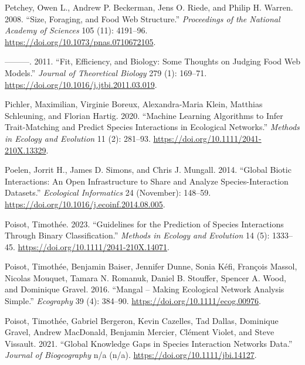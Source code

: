\documentclass[
  letterpaper,
  DIV=11,
  numbers=noendperiod]{scrartcl}
\newlength{\cslhangindent}
\newenvironment{CSLReferences}[2] %
 {\begin{list}{}{%
  \setlength{\itemindent}{0pt}
  \setlength{\leftmargin}{0pt}
  \setlength{\parsep}{0pt}
  \ifodd #1
   \setlength{\leftmargin}{\cslhangindent}
   \setlength{\itemindent}{-1\cslhangindent}
  \fi
  \setlength{\itemsep}{#2\baselineskip}}}
 {\end{list}}
\begin{document}
\begin{CSLReferences}{1}{0}
Petchey, Owen L., Andrew P. Beckerman, Jens O. Riede, and Philip H.
Warren. 2008. {``Size, Foraging, and Food Web Structure.''}
\emph{Proceedings of the National Academy of Sciences} 105 (11):
4191--96. \url{https://doi.org/10.1073/pnas.0710672105}.

---------. 2011. {``Fit, Efficiency, and Biology: {Some} Thoughts on
Judging Food Web Models.''} \emph{Journal of Theoretical Biology} 279
(1): 169--71. \url{https://doi.org/10.1016/j.jtbi.2011.03.019}.

Pichler, Maximilian, Virginie Boreux, Alexandra-Maria Klein, Matthias
Schleuning, and Florian Hartig. 2020. {``Machine Learning Algorithms to
Infer Trait-Matching and Predict Species Interactions in Ecological
Networks.''} \emph{Methods in Ecology and Evolution} 11 (2): 281--93.
\url{https://doi.org/10.1111/2041-210X.13329}.

Poelen, Jorrit H., James D. Simons, and Chris J. Mungall. 2014.
{``Global Biotic Interactions: {An} Open Infrastructure to Share and
Analyze Species-Interaction Datasets.''} \emph{Ecological Informatics}
24 (November): 148--59.
\url{https://doi.org/10.1016/j.ecoinf.2014.08.005}.

Poisot, Timothée. 2023. {``Guidelines for the Prediction of Species
Interactions Through Binary Classification.''} \emph{Methods in Ecology
and Evolution} 14 (5): 1333--45.
\url{https://doi.org/10.1111/2041-210X.14071}.

Poisot, Timothée, Benjamin Baiser, Jennifer Dunne, Sonia Kéfi, François
Massol, Nicolas Mouquet, Tamara N. Romanuk, Daniel B. Stouffer, Spencer
A. Wood, and Dominique Gravel. 2016. {``Mangal -- Making Ecological
Network Analysis Simple.''} \emph{Ecography} 39 (4): 384--90.
\url{https://doi.org/10.1111/ecog.00976}.

Poisot, Timothée, Gabriel Bergeron, Kevin Cazelles, Tad Dallas,
Dominique Gravel, Andrew MacDonald, Benjamin Mercier, Clément Violet,
and Steve Vissault. 2021. {``Global Knowledge Gaps in Species
Interaction Networks Data.''} \emph{Journal of Biogeography} n/a (n/a).
\url{https://doi.org/10.1111/jbi.14127}.


\end{CSLReferences}
\end{document}
